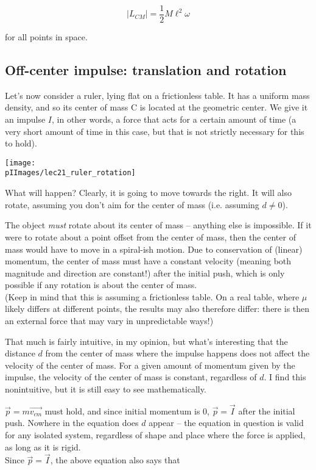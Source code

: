 \begin{equation}
|L_{CM}| = \frac{1}{2} M \ell^2 \omega
\end{equation}

for all points in space.

\subsection{Off-center impulse: translation and rotation}

Let's now consider a ruler, lying flat on a frictionless table. It has a uniform mass density, and so its center of mass C is located at the geometric center. We give it an impulse $I$, in other words, a force that acts for a certain amount of time (a very short amount of time in this case, but that is not strictly necessary for this to hold).

\begin{center}
\texttt{[image: \\pIImages/lec21\_ruler\_rotation]}
\end{center}

What will happen? Clearly, it is going to move towards the right. It will also rotate, assuming you don't aim for the center of mass (i.e. assuming $d \neq 0$).

The object \emph{must} rotate about its center of mass -- anything else is impossible. If it were to rotate about a point offset from the center of mass, then the center of mass would have to move in a spiral-ish motion. Due to conservation of (linear) momentum, the center of mass must have a constant velocity (meaning both magnitude and direction are constant!) after the initial push, which is only possible if any rotation is about the center of mass.\\
(Keep in mind that this is assuming a frictionless table. On a real table, where $\mu$ likely differs at different points, the results may also therefore differ: there is then an external force that may vary in unpredictable ways!)

That much is fairly intuitive, in my opinion, but what's interesting that the distance $d$ from the center of mass where the impulse happens does not affect the velocity of the center of mass. For a given amount of momentum given by the impulse, the velocity of the center of mass is constant, regardless of $d$. I find this nonintuitive, but it is still easy to see mathematically.

$\vec{p} = m \vec{v_{cm}}$ must hold, and since initial momentum is 0, $\vec{p} = \vec{I}$ after the initial push. Nowhere in the equation does $d$ appear -- the equation in question is valid for any isolated system, regardless of shape and place where the force is applied, as long as it is rigid.\\
Since $\vec{p} = \vec{I}$, the above equation also says that

